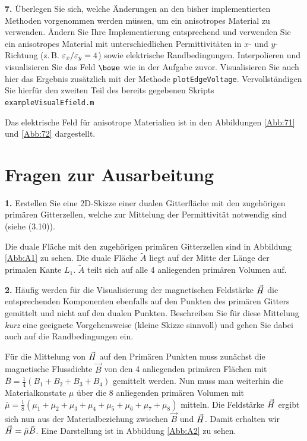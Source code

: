 \documentclass[Protokollheft.tex]{subfiles}
\begin{document}
\begin{framed}
	\noindent \textbf{7.} Überlegen Sie sich, welche Änderungen an den bisher implementierten Methoden 
vorgenommen werden müssen, um ein anisotropes Material zu verwenden. Ändern Sie 
Ihre Implementierung entsprechend und verwenden Sie ein anisotropes Material mit unterschiedlichen
Permittivitäten in $x$- und $y$-Richtung (z.\,B.
$\varepsilon_x / \varepsilon_y=4$) sowie elektrische
Randbedingungen. Interpolieren und visualisieren Sie das Feld
$\efit$ wie in der Aufgabe zuvor. Visualisieren Sie auch hier das Ergebnis zusätzlich mit der Methode \lstinline{plotEdgeVoltage}. Vervollständigen Sie hierfür den zweiten Teil des bereits gegebenen Skripts \lstinline{exampleVisualEfield.m}\label{exer:exampleVisualEfield2}\\
\end{framed}
\noindent
Das elektrische Feld für anisotrope Materialien ist in den Abbildungen \ref{Abb:71} und \ref{Abb:72} dargestellt.

\section{Fragen zur Ausarbeitung}

	\begin{framed}
	\noindent \textbf{1.} Erstellen Sie eine 2D-Skizze einer dualen
	Gitterfläche mit den zugehörigen primären Gitterzellen, welche
    zur Mittelung der Permittivität notwendig sind (siehe (3.10)).\label{exer:averagingEps}
\end{framed}
\noindent
Die duale Fläche mit den zugehörigen primären Gitterzellen sind in Abbildung \ref{Abb:A1} zu sehen. Die duale Fläche $\tilde{A}$ liegt auf der Mitte der Länge der primalen Kante $L_1$. $\tilde{A}$ teilt sich auf alle 4 anliegenden primären Volumen auf.


	\begin{framed}
	\noindent \textbf{2.} Häufig werden für die Visualisierung der magnetischen Feldstärke
	$ \vec{H} $ die entsprechenden Komponenten ebenfalls auf den Punkten des
	primären Gitters gemittelt und nicht auf den dualen
	Punkten. Beschreiben Sie für diese Mittelung \emph{kurz} eine geeignete Vorgehensweise (kleine Skizze sinnvoll)
	und gehen Sie dabei auch auf die Randbedingungen ein.\label{exer:averageHfield}
\end{framed}
\noindent
Für die Mittelung von $ \vec{H} $ auf den Primären Punkten muss zunächst die magnetische Flussdichte $\vec{B}$ von den 4 anliegenden primären Flächen mit $\bar{B}=\frac{1}{4}(B_1+B_2+B_3+B_4)$ gemittelt werden. Nun muss man weiterhin die Materialkonstate $\mu$ über die 8 anliegenden primären Volumen mit $\bar{\mu}=\frac{1}{8}(\mu_1+\mu_2+\mu_3+\mu_4+\mu_5+\mu_6+\mu_7+\mu_8)$ mitteln. Die Feldstärke $ \vec{H} $ ergibt sich nun aus der Materialbeziehung zwischen $\vec{B}$ und $ \vec{H} $. Damit erhalten wir $ \vec{H} =\bar{\mu}\bar{B}$. Eine Darstellung ist in Abbildung \ref{Abb:A2} zu sehen.
\end{document}
